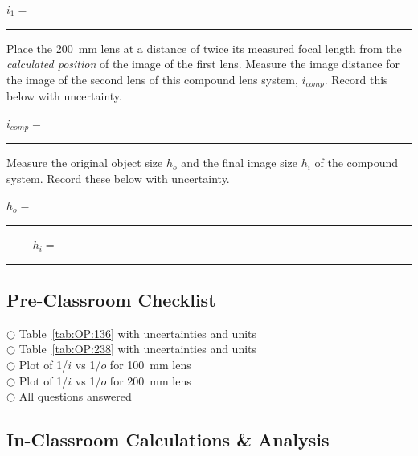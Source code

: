 \begin{center}
$i_1=$~\rule{3cm}{.1mm}
\end{center}


\noindent   Place the 200~mm lens at a distance of twice 
its measured focal length from the {\it calculated position} of the image of 
the first lens. 
Measure the image distance for the image of the second lens of this
compound lens system, $i_{comp}.$
Record this below with uncertainty.

\begin{center}
$i_{comp}=$~\rule{3cm}{.1mm}

\end{center}
\vspace*{.5cm}
\noindent
Measure the original object size $h_o$ and the final image size $h_i$ 
of the compound system.
Record these below with uncertainty.

\begin{center}
$h_o=$~\rule{3cm}{.1mm} ~~~~
$h_i=$~\rule{3cm}{.1mm}
\end{center}


\subsection{Pre-Classroom Checklist}

$\bigcirc$ \hspace*{1cm} Table~\ref{tab:OP:136} with uncertainties and units \\
$\bigcirc$ \hspace*{1cm} Table~\ref{tab:OP:238} with uncertainties and units \\
$\bigcirc$ \hspace*{1cm} Plot of 1/$i$ vs 1/$o$ for 100~mm lens \\
$\bigcirc$ \hspace*{1cm} Plot of 1/$i$ vs 1/$o$ for 200~mm lens \\
$\bigcirc$ \hspace*{1cm} All questions answered 
 

\subsection{In-Classroom Calculations \& Analysis}

